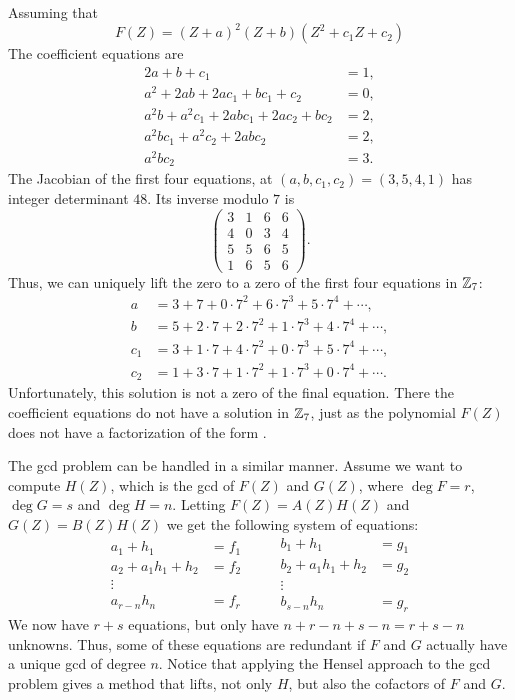 {Assuming that
\begin{equation} \label{Hensel:NSQEx:Eq}
F(Z) =  (Z + a)^2  (Z+b) (Z^2+c_1Z+c_2)
\end{equation}
The coefficient equations are 
\[
\begin{aligned}
2a + b + c_1 & = 1, \\
a^2 + 2ab + 2 ac_1 + b c_1 + c_2 & = 0, \\
a^2 b + a^2 c_1 + 2 a b c_1 + 2 a c_2 + b c_2 & = 2, \\
a^2 b c_1 + a^2 c_2 + 2 a b c_2 & = 2, \\
a^2 b c_2 & = 3.
\end{aligned}
\]
The Jacobian of the first four equations, at $(a,b,c_1,c_2) =
(3,5,4,1)$ has integer determinant $48$.  Its inverse modulo $7$ is
\[
\left(
\begin{array}{cccc}
3 & 1 & 6 & 6 \\
4 & 0 & 3 & 4 \\
5 & 5 & 6 & 5 \\
1 & 6 & 5 & 6 
\end{array}
\right).
\]
Thus, we can uniquely lift the zero to a zero of the first four
equations in $\mathbb{Z}_7$:
\[
\begin{aligned}
a   & = 3 +         7 + 0 \cdot 7^2 + 6 \cdot 7^3 + 5 \cdot 7^4 + \cdots, \\
b   & = 5 + 2 \cdot 7 + 2 \cdot 7^2 + 1 \cdot 7^3 + 4 \cdot 7^4 + \cdots, \\
c_1 & = 3 + 1 \cdot 7 + 4 \cdot 7^2 + 0 \cdot 7^3 + 5 \cdot 7^4 + \cdots, \\
c_2 & = 1 + 3 \cdot 7 + 1 \cdot 7^2 + 1 \cdot 7^3 + 0 \cdot 7^4 +
\cdots.
\end{aligned}
\]
Unfortunately, this solution is not a zero of the final equation.
There the coefficient equations do not have a solution in $\mathbb{Z}_7$, just
as the polynomial $F(Z)$ does not have a factorization of the form
.

\medskip
The {\sc gcd} problem can be handled in a similar manner.  Assume
we want to compute $H(Z)$, which is the {\sc gcd} of $F(Z)$ and $G(Z)$,
where $\deg F = r$, $\deg G = s$ and $\deg H = n$.  Letting $F(Z) =
A(Z) H(Z)$ and $G(Z) = B(Z) H(Z)$ we get the following system of
equations:
\[
\begin{aligned}
  a_1 + h_1 &= f_1\\
  a_2 + a_1 h_1 + h_2 &= f_2 \\
  \vdots\\
  a_{r - n} h_n & = f_r
\end{aligned} \qquad
\begin{aligned}
  b_1 + h_1 &= g_1\\
  b_2 + a_1 h_1 + h_2 &= g_2 \\
  \vdots\\
  b_{s - n} h_n & = g_r
\end{aligned}
\]
We now have $r+s$ equations, but only have $n + r -n + s - n = r + s
-n$ unknowns.  Thus, some of these equations are redundant if $F$
and $G$ actually have a unique {\sc gcd} of degree $n$.  Notice that
applying the Hensel approach to the {\sc gcd} problem gives a method
that lifts, not only $H$, but also the cofactors of $F$ and 
$G$. 

}
